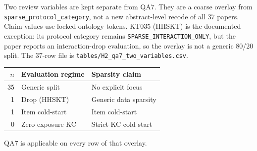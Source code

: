 \documentclass[lettersize,journal]{IEEEtran}
\begin{document}
Two review variables are kept separate from QA7. They are a coarse overlay from \texttt{sparse\_protocol\_category}, not a new abstract-level recode of all 37 papers. Claim values use locked ontology tokens. KT035 (HHSKT) is the documented exception: its protocol category remains \texttt{SPARSE\_INTERACTION\_ONLY}, but the paper reports an interaction-drop evaluation, so the overlay is not a generic 80/20 split. The 37-row file is \texttt{tables/H2\_qa7\_two\_variables.csv}.
\begin{center}
\footnotesize
\begin{tabular}{@{}rll@{}}
\toprule
$n$ & Evaluation regime & Sparsity claim \\
\midrule
35 & Generic split & No explicit focus \\
1 & Drop (HHSKT) & Generic data sparsity \\
1 & Item cold-start & Item cold-start \\
0 & Zero-exposure KC & Strict KC cold-start \\
\bottomrule
\end{tabular}
\end{center}
QA7 is applicable on every row of that overlay.
\end{document}
